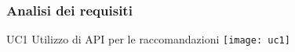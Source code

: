\begin{frame}
\frametitle{Analisi dei requisiti}
UC1 Utilizzo di API per le raccomandazioni
\texttt{[image: uc1]}
\end{frame}